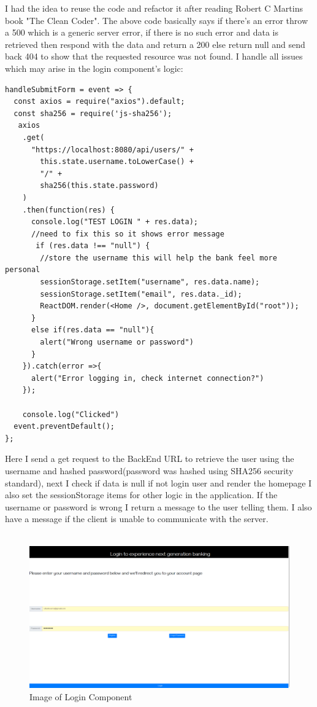 I had the idea to reuse the code and refactor it after reading Robert C Martins book "The Clean Coder"\cite{CleanCoder}.  The above code basically says if there's an error throw a 500 which is a generic server error, if there is no such error and data is retrieved then respond with the data and return a 200 else return null and send back 404 to show that the requested resource was not found.  I handle all issues which may arise in the login component's logic:
\begin{verbatim}
handleSubmitForm = event => {
  const axios = require("axios").default;
  const sha256 = require('js-sha256');
   axios
    .get(
      "https://localhost:8080/api/users/" +
        this.state.username.toLowerCase() +
        "/" +
        sha256(this.state.password)
    )
    .then(function(res) {
      console.log("TEST LOGIN " + res.data);
      //need to fix this so it shows error message
       if (res.data !== "null") {
        //store the username this will help the bank feel more personal
        sessionStorage.setItem("username", res.data.name);
        sessionStorage.setItem("email", res.data._id);
        ReactDOM.render(<Home />, document.getElementById("root"));
      }
      else if(res.data == "null"){
        alert("Wrong username or password")
      }
    }).catch(error =>{
      alert("Error logging in, check internet connection?")
    });

    console.log("Clicked")
  event.preventDefault();
};
\end{verbatim}
Here I send a get request to the BackEnd URL to retrieve the user using the username and
hashed password(password was hashed using SHA256 security standard), next I check if data is null
if not login user and render the homepage I also set the sessionStorage items for other logic in the application.
If the username or password is wrong I return a message to the user telling them.  I also have a message if the
client is unable to communicate with the server.
\\
\\
\begin{figure}[hb]
\includegraphics[width=\textwidth]{img/logincomponent.png}
\caption{Image of Login Component}
\label{fig:Image of login component}
\end{figure}
